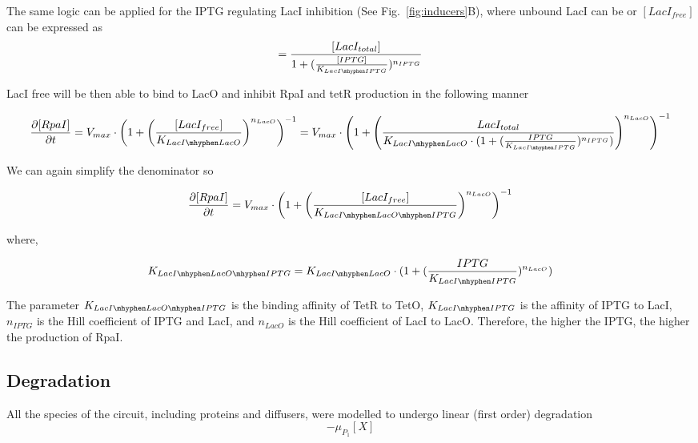 The same logic can be applied for the IPTG regulating LacI inhibition (See Fig.~\ref{fig:inducers}B), where unbound LacI can be or $[LacI_{free}]$ can be expressed as
\begin{equation}
[LacI{free}] =  \frac{[LacI_{total}]}{1+(\frac{[IPTG]}{K_{LacI \mhyphen IPTG}})^{n_{IPTG}}}
\end{equation}

LacI free will be then able to bind to LacO and inhibit RpaI and tetR production in the following manner

\begin{equation}
    \pdv{[RpaI]}{t} = V_{max}\cdot \left(1+\left(\frac{[LacI_{free}]}{K_{LacI \mhyphen LacO}}\right)^{n_{LacO}}\right)^{-1} = V_{max} \cdot \left(1+\left(\frac{LacI_{total}}{K_{LacI \mhyphen LacO}\cdot(1+(\frac{IPTG}{K_{LacI \mhyphen IPTG}})^{n_{IPTG}})}\right)^{n_{LacO}}\right)^{-1}
\end{equation}


We can again simplify the denominator so

\begin{equation}
    \pdv{[RpaI]}{t} = V_{max}\cdot \left(1+\left(\frac{[LacI_{free}]}{K_{LacI \mhyphen LacO \mhyphen IPTG }}\right)^{n_{LacO}}\right)^{-1}
\end{equation}

where,

\begin{equation}
    K_{LacI \mhyphen LacO \mhyphen IPTG} = K_{LacI \mhyphen LacO}\cdot(1+(\frac{IPTG}{K_{LacI \mhyphen IPTG}})^{n_{LacO}})
\end{equation}

The parameter $K_{LacI \mhyphen LacO \mhyphen IPTG}$ is the binding affinity of TetR to TetO, $K_{LacI \mhyphen IPTG}$ is the affinity of IPTG to LacI, $n_{IPTG}$ is the Hill coefficient of IPTG and LacI, and $n_{LacO}$ is the Hill coefficient of LacI to LacO. Therefore, the higher the IPTG, the higher the production of RpaI.




\subsection{Degradation}
All the species of the circuit, including proteins and diffusers, were modelled to undergo linear (first order) degradation
\begin{equation}
    -\mu_{P_{1}}[X]
    \label{linear degradation}
\end{equation}


